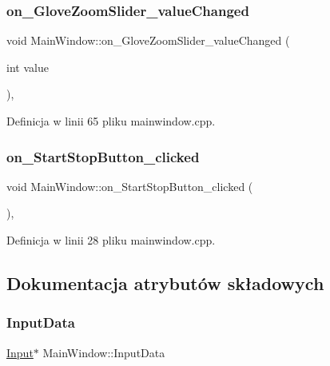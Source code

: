 \subsubsection{\texorpdfstring{on\+\_\+\+Glove\+Zoom\+Slider\+\_\+value\+Changed}{on\_GloveZoomSlider\_valueChanged}}
{\footnotesize\ttfamily void Main\+Window\+::on\+\_\+\+Glove\+Zoom\+Slider\+\_\+value\+Changed (\begin{DoxyParamCaption}\item[{int}]{value }\end{DoxyParamCaption})\hspace{0.3cm}{\ttfamily [private]}, {\ttfamily [slot]}}



Definicja w linii 65 pliku mainwindow.\+cpp.

\mbox{\label{class_main_window_a0975a297069f8f0cbbd8e7acfc7d85ba}} 
\subsubsection{\texorpdfstring{on\+\_\+\+Start\+Stop\+Button\+\_\+clicked}{on\_StartStopButton\_clicked}}
{\footnotesize\ttfamily void Main\+Window\+::on\+\_\+\+Start\+Stop\+Button\+\_\+clicked (\begin{DoxyParamCaption}{ }\end{DoxyParamCaption})\hspace{0.3cm}{\ttfamily [private]}, {\ttfamily [slot]}}



Definicja w linii 28 pliku mainwindow.\+cpp.



\subsection{Dokumentacja atrybutów składowych}
\mbox{\label{class_main_window_aa4484150b90e4d13bb42316d12c34650}} 
\subsubsection{\texorpdfstring{Input\+Data}{InputData}}
{\footnotesize\ttfamily \hyperlink{class_input}{Input}$\ast$ Main\+Window\+::\+Input\+Data\hspace{0.3cm}{\ttfamily [private]}}



